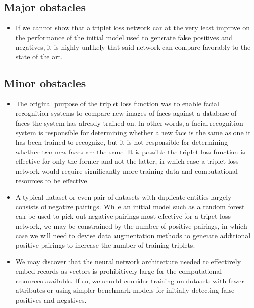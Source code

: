 \documentclass{proc}
\begin{document}
\subsection{Major obstacles} 

\begin{itemize}
  \item If we cannot show that a triplet loss network can at the very least improve on the performance of the initial model used to generate false positives and negatives, it is highly unlikely that said network can compare favorably to the state of the art.
\end{itemize}

\subsection{Minor obstacles}

\begin{itemize}
  \item The original purpose of the triplet loss function was to enable facial recognition systems to compare new images of faces against a database of faces the system has already trained on. In other words, a facial recognition system is responsible for determining whether a new face is the same as one it has been trained to recognize, but it is not responsible for determining whether two new faces are the same. It is possible the triplet loss function is effective for only the former and not the latter, in which case a triplet loss network would require significantly more training data and computational resources to be effective.
  \item A typical dataset or even pair of datasets with duplicate entities largely consists of negative pairings. While an initial model such as a random forest can be used to pick out negative pairings most effective for a tripet loss network, we may be constrained by the number of positive pairings, in which case we will need to devise data augmentation methods to generate additional positive pairings to increase the number of training triplets.
  \item We may discover that the neural network architecture needed to effectively embed records as vectors is prohibitively large for the computational resources available. If so, we should consider training on datasets with fewer attributes or using simpler benchmark models for initially detecting false positives and negatives.
\end{itemize}
\end{document}
